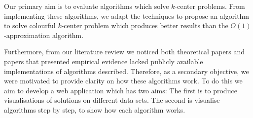 Our primary aim is to evaluate algorithms which solve $k$-center problems. From implementing these algorithms, we adapt the techniques to propose an algorithm to solve colourful $k$-center problem which produces better results than the $O(1)$-approximation algorithm. 

Furthermore, from our literature review we noticed both theoretical papers and papers that presented empirical evidence lacked publicly available implementations of algorithms described. Therefore, as a secondary objective, we were motivated to provide clarity on how these algorithms work. To do this we aim to develop a web application which has two aims: The first is to produce visualisations of solutions on different data sets. The second is visualise algorithms step by step, to show how each algorithm works.